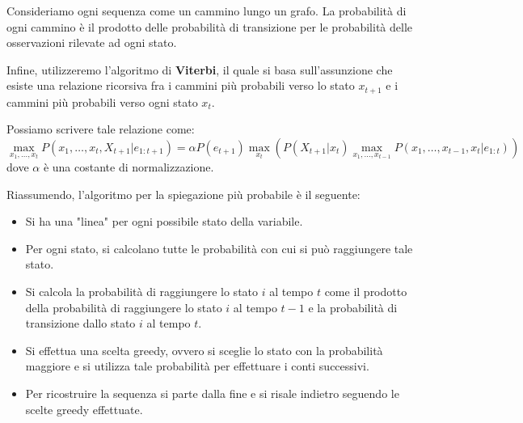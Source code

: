 \begin{itemize}
          Consideriamo ogni sequenza come un cammino lungo un grafo. La probabilità
          di ogni cammino è il prodotto delle probabilità di transizione per le
          probabilità delle osservazioni rilevate ad ogni stato.

          Infine, utilizzeremo l'algoritmo di \textbf{Viterbi}, il quale si basa
          sull'assunzione che esiste una relazione ricorsiva fra i cammini più
          probabili verso lo stato $x_{t+1}$ e i cammini più probabili verso
          ogni stato $x_t$.

          Possiamo scrivere tale relazione come:
          \begin{equation}
              \max _{x_1,\dots, x_t} P(x_1,\dots,x_t,X_{t+1}|e_{1:t+1}) = \alpha
              P(e_{t+1})\max_{x_t} \left(P(X_{t+1}|x_t)\max_{x_1,\dots,x_{t-1}}
              P(x_1,\dots,x_{t-1},x_t|e_{1:t})\right)
          \end{equation}
          dove $\alpha$ è una costante di normalizzazione.

          Riassumendo, l'algoritmo per la spiegazione più probabile è il seguente:
          \begin{itemize}
              \item Si ha una "linea" per ogni possibile stato della variabile.
              \item Per ogni stato, si calcolano tutte le probabilità con cui
                    si può raggiungere tale stato.
              \item Si calcola la probabilità di raggiungere lo stato $i$ al tempo
                    $t$ come il prodotto della probabilità di raggiungere lo stato
                    $i$ al tempo $t-1$ e la probabilità di transizione dallo
                    stato $i$ al tempo $t$.
              \item Si effettua una scelta greedy, ovvero si sceglie lo stato con
                    la probabilità maggiore e si utilizza tale probabilità per
                    effettuare i conti successivi.
              \item Per ricostruire la sequenza si parte dalla fine e si risale
                    indietro seguendo le scelte greedy effettuate.
          \end{itemize}
\end{itemize}